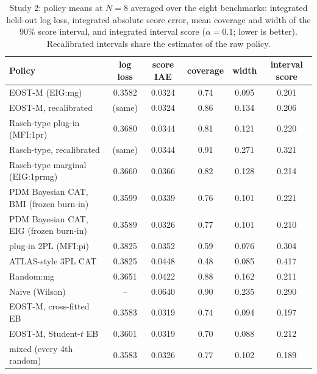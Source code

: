 \begin{table}[tbp]
\centering\footnotesize
\caption{Study 2: policy means at $N=8$ averaged over the eight benchmarks: integrated held-out log loss, integrated absolute score error, mean coverage and width of the 90\% score interval, and integrated interval score ($\alpha=0.1$; lower is better). Recalibrated intervals share the estimates of the raw policy.}
\label{tab:study2policies}
\setlength{\tabcolsep}{4pt}
\begin{tabular}{@{}lccccc@{}}
\toprule
Policy & log loss & score IAE & coverage & width & interval score \\
\midrule
EOST-M (EIG:mg) & 0.3582 & 0.0324 & 0.74 & 0.095 & 0.201 \\
EOST-M, recalibrated & (same) & 0.0324 & 0.86 & 0.134 & 0.206 \\
Rasch-type plug-in (MFI:1pr) & 0.3680 & 0.0344 & 0.81 & 0.121 & 0.220 \\
Rasch-type, recalibrated & (same) & 0.0344 & 0.91 & 0.271 & 0.321 \\
Rasch-type marginal (EIG:1prmg) & 0.3660 & 0.0366 & 0.82 & 0.128 & 0.214 \\
PDM Bayesian CAT, BMI (frozen burn-in) & 0.3599 & 0.0339 & 0.76 & 0.101 & 0.221 \\
PDM Bayesian CAT, EIG (frozen burn-in) & 0.3589 & 0.0326 & 0.77 & 0.101 & 0.210 \\
plug-in 2PL (MFI:pi) & 0.3825 & 0.0352 & 0.59 & 0.076 & 0.304 \\
ATLAS-style 3PL CAT & 0.3825 & 0.0448 & 0.48 & 0.085 & 0.417 \\
Random:mg & 0.3651 & 0.0422 & 0.88 & 0.162 & 0.211 \\
Naive (Wilson) & -- & 0.0640 & 0.90 & 0.235 & 0.290 \\
EOST-M, cross-fitted EB & 0.3583 & 0.0319 & 0.74 & 0.094 & 0.197 \\
EOST-M, Student-$t$ EB & 0.3601 & 0.0319 & 0.70 & 0.088 & 0.212 \\
mixed (every 4th random) & 0.3583 & 0.0326 & 0.77 & 0.102 & 0.189 \\
\bottomrule
\end{tabular}
\end{table}
